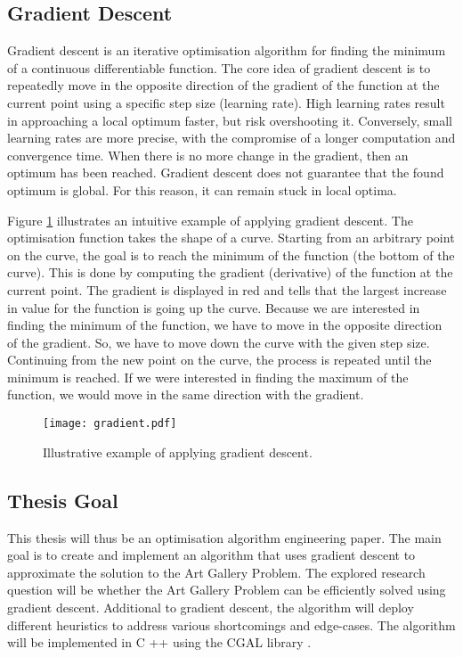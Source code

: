 \newpage
\subsection{Gradient Descent}

Gradient descent is an iterative optimisation algorithm for finding the minimum of a continuous differentiable function. The core idea of gradient descent is to repeatedly move in the opposite direction of the gradient of the function at the current point using a specific step size (learning rate). High learning rates result in approaching a local optimum faster, but risk overshooting it. Conversely, small learning rates are more precise, with the compromise of a longer computation and convergence time.
When there is no more change in the gradient, then an optimum has been reached. Gradient descent does not guarantee that the found optimum is global. For this reason, it can remain stuck in local optima.

Figure \ref{fig:gradient_descent} illustrates an intuitive example of applying gradient descent. The optimisation function takes the shape of a curve. Starting from an arbitrary point on the curve, the goal is to reach the minimum of the function (the bottom of the curve). This is done by computing the gradient (derivative) of the function at the current point. The gradient is displayed in red and tells that the largest increase in value for the function is going up the curve. Because we are interested in finding the minimum of the function, we have to move in the opposite direction of the gradient. So, we have to move down the curve with the given step size. Continuing from the new point on the curve, the process is repeated until the minimum is reached.
If we were interested in finding the maximum of the function, we would move in the same direction with the gradient.

\begin{figure}[h!]
    \centering
    \texttt{[image: gradient.pdf]}
    \caption{Illustrative example of applying gradient descent.}
    \label{fig:gradient_descent}
\end{figure}

\subsection{Thesis Goal}
This thesis will thus be an optimisation algorithm engineering paper. The main goal is to create and implement an algorithm that uses gradient descent to approximate the solution to the Art Gallery Problem. The explored research question will be whether the Art Gallery Problem can be efficiently solved using gradient descent. Additional to gradient descent, the algorithm will deploy different heuristics to address various shortcomings and edge-cases.
The algorithm will be implemented in C ++ using the CGAL library \cite{cgal}.

